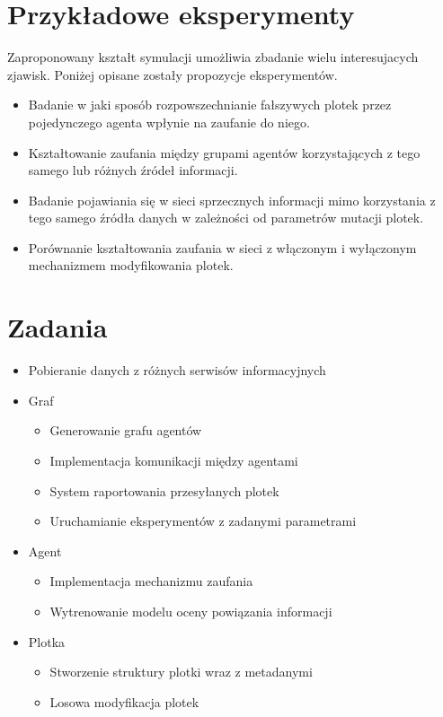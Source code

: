 \documentclass{article}
\begin{document}
	\section{Przykładowe eksperymenty}
	Zaproponowany kształt symulacji umożliwia zbadanie wielu interesujacych zjawisk. Poniżej opisane zostały propozycje eksperymentów.
	\begin{itemize}
	\item Badanie w jaki sposób rozpowszechnianie fałszywych plotek przez pojedynczego agenta wpłynie na zaufanie do niego.
	\item Kształtowanie zaufania między grupami agentów korzystających z tego samego lub różnych źródeł informacji.
	\item Badanie pojawiania się w sieci sprzecznych informacji mimo korzystania z tego samego źródła danych w zależności od parametrów mutacji plotek.
	\item Porównanie kształtowania zaufania w sieci z włączonym i wyłączonym mechanizmem modyfikowania plotek.
	\end{itemize}
	\section{Zadania}
	\begin{itemize}
	\item Pobieranie danych z różnych serwisów informacyjnych
	\item Graf
		\begin{itemize}
		\item Generowanie grafu agentów
		\item Implementacja komunikacji między agentami
		\item System raportowania przesyłanych plotek
		\item Uruchamianie eksperymentów z zadanymi parametrami
		\end{itemize}
	\item Agent
		\begin{itemize}
		\item Implementacja mechanizmu zaufania
		\item Wytrenowanie modelu oceny powiązania informacji
		\end{itemize}
	\item Plotka
		\begin{itemize}
		\item Stworzenie struktury plotki wraz z metadanymi
		\item Losowa modyfikacja plotek
		\end{itemize}
	\end{itemize}
\end{document}
